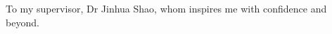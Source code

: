\begin{acknowledgments}
To my supervisor, Dr Jinhua Shao, whom inspires me with confidence and beyond.
\end{acknowledgments}